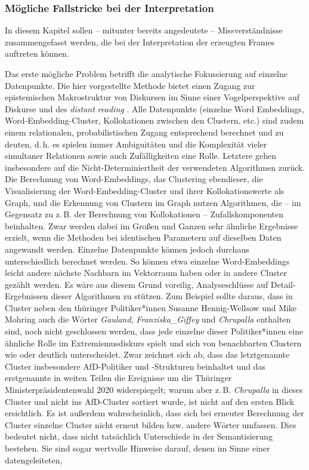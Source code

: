 \subsubsection{Mögliche Fallstricke bei der Interpretation}\label{moegliche-fallstricke-bei-der-interpretation}

In diesem Kapitel sollen -- mitunter bereits angedeutete -- Missverständnisse zusammengefasst werden, die bei der Interpretation der erzeugten Frames auftreten können.

Das erste mögliche Problem betrifft die analytische Fokussierung auf einzelne Datenpunkte. Die hier vorgestellte Methode bietet einen Zugang zur epistemischen Makrostruktur von Diskursen im Sinne einer Vogelperspektive auf Diskurse und des \emph{distant reading} \autocite{morettiConjecturesWorldLiterature2000}. Alle Datenpunkte (einzelne Word Embeddings, Word-Embedding-Cluster, Kollokationen zwischen den Clustern, etc.) sind zudem einem relationalen, probabilistischen Zugang entsprechend berechnet und zu deuten, d.\,h. es spielen immer Ambiguitäten und die Komplexität vieler simultaner Relationen sowie auch Zufälligkeiten eine Rolle. Letztere gehen insbesondere auf die Nicht-Determiniertheit der verwendeten Algorithmen zurück. Die Berechnung von Word-Embeddings, das Clustering ebendieser, die Visualisierung der Word-Embedding-Cluster und ihrer Kollokationswerte als Graph, und die Erkennung von Clustern im Graph nutzen Algorithmen, die -- im Gegensatz zu z.\,B. der Berechnung von Kollokationen -- Zufallskomponenten beinhalten. Zwar werden dabei im Großen und Ganzen sehr ähnliche Ergebnisse erzielt, wenn die Methoden bei identischen Parametern auf dieselben Daten angewandt werden. Einzelne Datenpunkte können jedoch durchaus unterschiedlich berechnet werden. So können etwa einzelne Word-Embeddings leicht andere nächste Nachbarn im Vektorraum haben oder in andere Cluster gezählt werden. Es wäre aus diesem Grund voreilig, Analyseschlüsse auf Detail-Ergebnissen dieser Algorithmen zu stützen. Zum Beispiel sollte daraus, dass in Cluster  neben den thüringer Politiker*innen Susanne Hennig-Wellsow und Mike Mohring auch die Wörter \emph{Gauland}, \emph{Franziska\_Giffey} und \emph{Chrupalla} enthalten sind, noch nicht geschlossen werden, dass jede einzelne dieser Politiker*innen eine ähnliche Rolle im Extremismusdiskurs spielt und sich von benachbarten Clustern wie  oder  deutlich unterscheidet. Zwar zeichnet sich ab, dass das letztgenannte Cluster insbesondere AfD-Politiker und -Strukturen beinhaltet und das erstgenannte in weiten Teilen die Ereignisse um die Thüringer Ministerpräsidentenwahl 2020 widerspiegelt; warum aber z.\,B. \emph{Chrupalla} in dieses Cluster und nicht ins AfD-Cluster sortiert wurde, ist nicht auf den ersten Blick ersichtlich. Es ist außerdem wahrscheinlich, dass sich bei erneuter Berechnung der Cluster einzelne Cluster nicht erneut bilden bzw. andere Wörter umfassen. Dies bedeutet nicht, dass nicht tatsächlich Unterschiede in der Semantisierung bestehen. Sie sind sogar wertvolle Hinweise darauf, denen im Sinne einer datengeleiteten, 